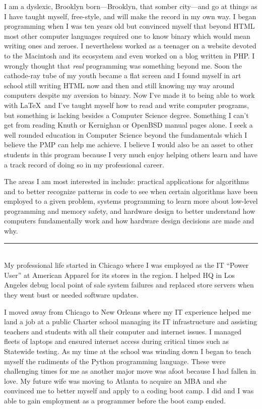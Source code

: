 \documentclass[12pt]{article}
\begin{document}
I am a dyslexic, Brooklyn born---Brooklyn, that somber city---and go at things as I have taught myself, free-style, and will make the record in my own way.
I began programming when I was ten years old but convinced myself that beyond HTML most other computer languages required one to know binary which would mean writing ones and zeroes. I nevertheless worked as a teenager on a website devoted to the Macintosh and its ecosystem and even worked on a blog written in PHP. I wrongly thought that \emph{real} programming was something beyond me. Soon the cathode-ray tube of my youth became a flat screen and I found myself in art school still writing HTML now and then and still knowing my way around computers despite my aversion to binary. Now I've made it to being able to work with \LaTeX\ and I've taught myself how to read and write computer programs, but something is lacking besides a Computer Science degree. Something I can't get from reading Knuth or Kernighan or OpenBSD manual pages alone. I seek a well rounded education in Computer Science beyond the fundamentals which I believe the PMP can help me achieve. I believe I would also be an asset to other students in this program because I very much enjoy helping others learn and have a track record of doing so in my professional career.

The areas I am most interested in include: practical applications for algorithms and to better recognize patterns in code to see when certain algorithms  have been employed to a given problem, systems programming to learn more about low-level programming and memory safety, and hardware design to better understand how computers fundamentally work and how hardware design decisions are made and why.\\

\hrule\
\\

My professional life started in Chicago where I was employed as the IT ``Power User'' at American Apparel for its stores in the region. I helped HQ in Los Angeles debug local point of sale system failures and replaced store servers when they went bust or needed software updates.

I moved away from Chicago to New Orleans where my IT experience helped me land a job at a public Charter school managing its IT infrastructure and assisting teachers and students with all their computer and internet issues. I managed fleets of laptops and ensured internet access during critical times such as Statewide testing. As my time at the school was winding down I began to teach myself the rudiments of the Python programming language. These were challenging times for me as another major move was afoot because I had fallen in love. My future wife was moving to Atlanta to acquire an MBA and she convinced me to better myself and apply to a coding boot camp. I did and I was able to gain employment as a programmer before the boot camp ended.
\end{document}
